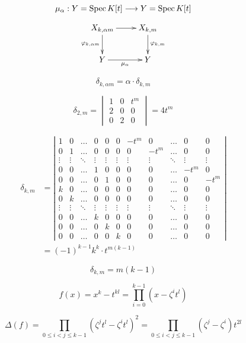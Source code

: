 \[
    \mu_\alpha: Y=\operatorname{Spec} K[t] \longrightarrow Y=\operatorname{Spec} K[t]
\]

\[
    \xymatrix{
        X_{k,\alpha m}\ar[r]\ar[d]_{\varphi_{k,\alpha m}}& X_{k,m}\ar[d]^{\varphi_{k, m}}\\
        Y\ar[r]_{\mu_\alpha}& Y
    }
\]

\[
    \delta_{k, \alpha m}=\alpha \cdot \delta_{k, m}
\]

\[
    \delta_{2, m}=\begin{vmatrix}
        1 & 0 & t^m \\
        2 & 0 & 0 \\
        0 & 2 & 0
    \end{vmatrix}=4 t^m
\]

\[
    \begin{aligned}
        \delta_{k, m} & =\left|\begin{array}{ccccccccccc}
        1 & 0 & \ldots & 0 & 0 & 0 & -t^m & 0 & \ldots & 0 & 0 \\
        0 & 1 & \ldots & 0 & 0 & 0 & 0 & -t^m & \ldots & 0 & 0 \\
        \vdots & \vdots & \ddots & \vdots & \vdots & \vdots & \vdots & \vdots & \ddots & \vdots & \vdots \\
        0 & 0 & \ldots & 1 & 0 & 0 & 0 & 0 & \ldots & -t^m & 0 \\
        0 & 0 & \ldots & 0 & 1 & 0 & 0 & 0 & \ldots & 0 & -t^m \\
        k & 0 & \ldots & 0 & 0 & 0 & 0 & 0 & \ldots & 0 & 0 \\
        0 & k & \ldots & 0 & 0 & 0 & 0 & 0 & \ldots & 0 & 0 \\
        \vdots & \vdots & \ddots & \vdots & \vdots & \vdots & \vdots & \vdots & \ddots & \vdots & \vdots \\
        0 & 0 & \ldots & k & 0 & 0 & 0 & 0 & \ldots & 0 & 0 \\
        0 & 0 & \ldots & 0 & k & 0 & 0 & 0 & \ldots & 0 & 0 \\
        0 & 0 & \ldots & 0 & 0 & k & 0 & 0 & \ldots & 0 & 0
        \end{array}\right| \\
        & =(-1)^{k-1} k^k \cdot t^{m(k-1)}
        \end{aligned}
\]

\[
    \delta_{k, m}=m(k-1)
\]


\[
    f(x)=x^k-t^{k l}=\prod_{i=0}^{k-1}(x-\zeta^i t^l)
\]

\[
    \Delta(f)=\prod_{0 \leq i<j \leq k-1}(\zeta^j t^l-\zeta^i t^l)^2=\prod_{0 \leq i<j \leq k-1}(\zeta^j-\zeta^i) t^{2 l}
\]

